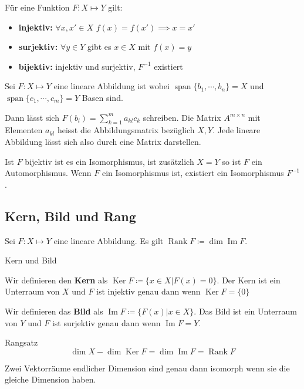 \documentclass[a4paper,10pt]{article}
\DeclareMathOperator{\Rank}{Rank}
\DeclareMathOperator{\Image}{Im}
\DeclareMathOperator{\Kernel}{Ker}
\DeclareMathOperator{\Span}{span}
\begin{document}
Für eine Funktion $F: X \mapsto Y$ gilt:
\begin{itemize}
  \item \textbf{injektiv:} $\forall x, x' \in X$ $f(x) = f(x') \implies x = x'$
  \item \textbf{surjektiv:} $\forall y \in Y$ gibt es $x \in X$ mit $f(x) = y$
  \item \textbf{bijektiv:} injektiv und surjektiv, $F^{-1}$ existiert
\end{itemize}

Sei $F: X \mapsto Y$ eine lineare Abbildung ist wobei $\Span \{ b_1, \cdots, b_n \} = X$ und $\Span \{ c_1, \cdots, c_m \} = Y$ Basen sind.

Dann lässt sich $F(b_l) = \sum_{k=1}^m a_{kl} c_k$ schreiben. Die Matrix $A^{m \times n}$ mit Elementen $a_{kl}$ heisst die Abbildungsmatrix bezüglich $X, Y$. Jede lineare Abbildung lässt sich also durch eine Matrix darstellen.

Ist $F$ bijektiv ist es ein Isomorphismus, ist zusätzlich $X = Y$ so ist $F$ ein Automorphismus. Wenn $F$ ein Isomorphismus ist, existiert ein Isomorphismus $F^{-1}$.

\subsection{Kern, Bild und Rang}


Sei $F: X \mapsto Y$ eine lineare Abbildung. Es gilt $\Rank F \coloneqq \dim \Image F$.

\begin{mainbox}{Kern und Bild}

  Wir definieren den \textbf{Kern} als $\Kernel F \coloneqq \{x \in X | F(x) = 0\}$. Der Kern ist ein Unterraum von $X$ und $F$ ist injektiv genau dann wenn $\Kernel F = \{0\}$

  Wir definieren das \textbf{Bild} als $\Image F \coloneqq \{F(x) | x \in X\}$. Das Bild ist ein Unterraum von $Y$ und $F$ ist surjektiv genau dann wenn $\Image F = Y$.
\end{mainbox}

\begin{mainbox}{Rangsatz}
  $$\dim X - \dim \Kernel F = \dim \Image F = \Rank F$$
\end{mainbox}

Zwei Vektorräume endlicher Dimension sind genau dann isomorph wenn sie die gleiche Dimension haben.
\end{document}
